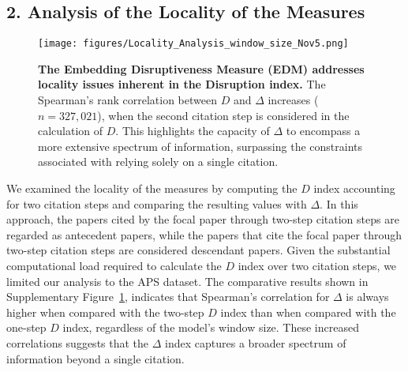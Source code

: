 \documentclass[12pt]{article}
\begin{document}
\begin{refsection}
\subsection*{2. Analysis of the Locality of the Measures}
\label{suppinfo:additional_disruption}
\begin{figure}[htbp]
    \centering
    \texttt{[image: figures/Locality\_Analysis\_window\_size\_Nov5.png]}
    \caption{ \textbf{The Embedding Disruptiveness Measure (EDM) addresses locality issues inherent in the Disruption index.} The Spearman's rank correlation between $D$ and $\Delta$ increases ($n = 327,021$), when the second citation step is considered in the calculation of $D$. This highlights the capacity of $\Delta$ to encompass a more extensive spectrum of information, surpassing the constraints associated with relying solely on a single citation. }
\label{fig:distribution_disruption1}
\end{figure}

We examined the locality of the measures by computing the $D$ index accounting for two citation steps and comparing the resulting values with $\Delta$. In this approach, the papers cited by the focal paper through two-step citation steps are regarded as antecedent papers, while the papers that cite the focal paper through two-step citation steps are considered descendant papers.
Given the substantial computational load required to calculate the $D$ index over two citation steps, we limited our analysis to the APS dataset. The comparative results shown in Supplementary Figure~\ref{fig:distribution_disruption1}, indicates that Spearman's correlation for $\Delta$ is always higher when compared with the two-step $D$ index than when compared with the one-step $D$ index, regardless of the model's window size. These increased correlations suggests that the $\Delta$ index captures a broader spectrum of information beyond a single citation.


\end{refsection}
\end{document}
